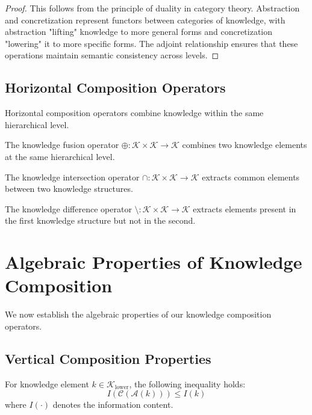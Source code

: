 \begin{proof}
This follows from the principle of duality in category theory. Abstraction and concretization represent functors between categories of knowledge, with abstraction "lifting" knowledge to more general forms and concretization "lowering" it to more specific forms. The adjoint relationship ensures that these operations maintain semantic consistency across levels.
\end{proof}

\subsection{Horizontal Composition Operators}

Horizontal composition operators combine knowledge within the same hierarchical level.

\begin{definition}
The knowledge fusion operator $\oplus: \mathcal{K} \times \mathcal{K} \rightarrow \mathcal{K}$ combines two knowledge elements at the same hierarchical level.
\end{definition}

\begin{definition}
The knowledge intersection operator $\cap: \mathcal{K} \times \mathcal{K} \rightarrow \mathcal{K}$ extracts common elements between two knowledge structures.
\end{definition}

\begin{definition}
The knowledge difference operator $\setminus: \mathcal{K} \times \mathcal{K} \rightarrow \mathcal{K}$ extracts elements present in the first knowledge structure but not in the second.
\end{definition}

\section{Algebraic Properties of Knowledge Composition}

We now establish the algebraic properties of our knowledge composition operators.

\subsection{Vertical Composition Properties}

\begin{theorem}
For knowledge element $k \in \mathcal{K}_{\text{lower}}$, the following inequality holds:
\begin{equation}
I(\mathcal{C}(\mathcal{A}(k))) \leq I(k)
\end{equation}
where $I(\cdot)$ denotes the information content.
\end{theorem}

